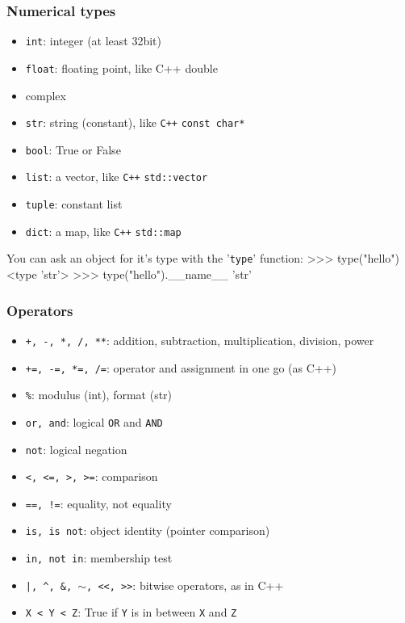 \documentclass[hyperref={colorlinks=true}]{beamer}
\begin{document}

\begin{frame}[fragile]
  \frametitle{Numerical types}

  \begin{itemize}
    \item \texttt{int}: integer (at least 32bit)
    \item \texttt{float}: floating point, like C++ double
    \item complex
    \item \texttt{str}: string (constant), like \texttt{C++} \texttt{const char*}
    \item \texttt{bool}: True or False
    \item \texttt{list}: a vector, like \texttt{C++} \texttt{std::vector}
    \item \texttt{tuple}: constant list
    \item \texttt{dict}: a map, like \texttt{C++} \texttt{std::map}
  \end{itemize}
  
  \begin{ucpythonblock}{You can ask an object for it's type with the '\texttt{type}' function:}
>>> type("hello")
<type 'str'>
>>> type("hello").__name__
'str'  
  \end{ucpythonblock}
  
\end{frame}



\begin{frame}[fragile]
  \frametitle{Operators}

  \begin{itemize}
    \item \texttt{+, -, *, /, **}: addition, subtraction, multiplication, division, power 
    \item \texttt{+=, -=, *=, /=}: operator and assignment in one go (as C++)
    \item \texttt{\%}: modulus (int), format (str)
    \item \texttt{or, and}: logical \texttt{OR} and \texttt{AND}
    \item \texttt{not}: logical negation
    \item \texttt{<, <=, >, >=}: comparison
    \item \texttt{==, !=}: equality, not equality
    \item \texttt{is, is not}: object identity (pointer comparison) 
    \item \texttt{in, not in}: membership test
    \item \texttt{|, \^{}, \&, $\sim$, <<, >>}: bitwise operators, as in C++ 
    \item \texttt{X < Y < Z}: True if \texttt{Y} is in between \texttt{X} and \texttt{Z}
  \end{itemize}

\end{frame}
\end{document}
